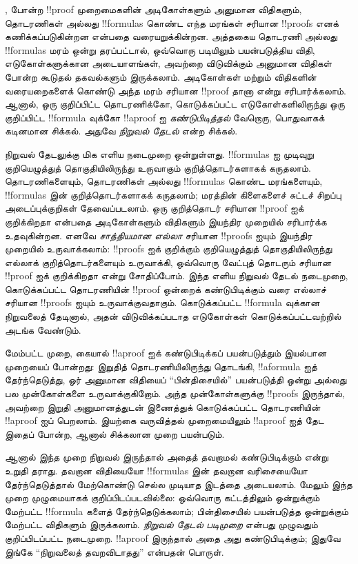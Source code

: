 \documentclass[../../../include/open-logic-section]{subfiles}
\begin{document}


,  போன்ற !!{proof} முறைமைகளின்
அடிகோள்களும் அனுமான விதிகளும், தொடரணிகள் அல்லது
!!{formula}s கொண்ட எந்த மரங்கள் சரியான !!{proof}s
எனக் கணிக்கப்படுகின்றன என்பதை வரையறுக்கின்றன.
அத்தகைய தொடரணி அல்லது !!{formula}s மரம் ஒன்று தரப்பட்டால்,
ஒவ்வொரு படியிலும் பயன்படுத்திய விதி, எடுகோள்களுக்கான
அடையாளங்கள், அவற்றை விடுவிக்கும் அனுமான விதிகள் போன்ற
கூடுதல் தகவல்களும் இருக்கலாம். அடிகோள்கள் மற்றும் விதிகளின்
வரையறைகளைக் கொண்டு அந்த மரம் சரியான !!{proof} தானா
என்று சரிபார்க்கலாம். ஆனால், ஒரு குறிப்பிட்ட தொடரணிக்கோ,
கொடுக்கப்பட்ட எடுகோள்களிலிருந்து ஒரு குறிப்பிட்ட
!!{formula} வுக்கோ !!a{proof} ஐ \emph{கண்டுபிடித்தல்}
வேறொரு, பொதுவாகக் கடினமான சிக்கல். அதுவே
\emph{நிறுவல் தேடல்} என்ற சிக்கல்.

நிறுவல் தேடலுக்கு மிக எளிய நடைமுறை ஒன்றுள்ளது.
!!{formula}s ஐ முடிவுறு குறியெழுத்துத் தொகுதியிலிருந்து
உருவாகும் குறித்தொடர்களாகக் கருதலாம். தொடரணிகளையும்,
தொடரணிகள் அல்லது !!{formula}s கொண்ட மரங்களையும்,
!!{formula}s இன் குறித்தொடர்களாகக் கருதலாம்; மரத்தின்
கிளைகளைச் சுட்டச் சிறப்பு அடைப்புக்குறிகள் தேவைப்படலாம்.
ஒரு குறித்தொடர் சரியான !!{proof} ஐக் குறிக்கிறதா என்பதை
அடிகோள்களும் விதிகளும் இயந்திர முறையில் சரிபார்க்க உதவுகின்றன.
எனவே \emph{சாத்தியமான எல்லா} சரியான !!{proof}s ஐயும்
இயந்திர முறையில் உருவாக்கலாம்: !!{proof}s ஐக் குறிக்கும்
குறியெழுத்துத் தொகுதியிலிருந்து எல்லாக் குறித்தொடர்களையும்
உருவாக்கி, ஒவ்வொரு வேட்புத் தொடரும் சரியான !!{proof} ஐக்
குறிக்கிறதா என்று சோதிப்போம். இந்த எளிய நிறுவல் தேடல்
நடைமுறை, கொடுக்கப்பட்ட தொடரணியின் !!{proof} ஒன்றைக்
கண்டுபிடிக்கும் வரை எல்லாச் சரியான !!{proof}s ஐயும்
உருவாக்குவதாகும். கொடுக்கப்பட்ட !!{formula} வுக்கான
நிறுவலைத் தேடினால், அதன் விடுவிக்கப்படாத எடுகோள்கள்
கொடுக்கப்பட்டவற்றில் அடங்க வேண்டும்.

மேம்பட்ட முறை, கையால் !!a{proof} ஐக் கண்டுபிடிக்கப்
பயன்படுத்தும் இயல்பான முறையைப் போன்றது: இறுதித்
தொடரணியிலிருந்து தொடங்கி, !!a{formula} ஐத் தேர்ந்தெடுத்து,
ஓர் அனுமான விதியைப் ``பின்திசையில்'' பயன்படுத்தி ஒன்று
அல்லது பல முன்கோள்களை உருவாக்குகிறோம். அந்த முன்கோள்களுக்கு
!!{proof}s இருந்தால், அவற்றை இறுதி அனுமானத்துடன் இணைத்துக்
கொடுக்கப்பட்ட தொடரணியின் !!a{proof} ஐப் பெறலாம்.
இயற்கை வருவித்தல் முறைமையிலும் !!a{proof} ஐத் தேட
இதைப் போன்ற, ஆனால் சிக்கலான முறை பயன்படும்.

ஆனால் இந்த முறை நிறுவல் இருந்தால் அதைத் தவறாமல்
கண்டுபிடிக்கும் என்று உறுதி தராது. தவறான விதியையோ
!!{formula}s இன் தவறான வரிசையையோ தேர்ந்தெடுத்தால்
மேற்கொண்டு செல்ல முடியாத இடத்தை அடையலாம். மேலும்
இந்த முறை முழுமையாகக் குறிப்பிடப்படவில்லை: ஒவ்வொரு
கட்டத்திலும் ஒன்றுக்கும் மேற்பட்ட !!{formula} களைத்
தேர்ந்தெடுக்கலாம்; பின்திசையில் பயன்படுத்த ஒன்றுக்கும்
மேற்பட்ட விதிகளும் இருக்கலாம். \emph{நிறுவல் தேடல் படிமுறை}
என்பது முழுவதும் குறிப்பிடப்பட்ட நடைமுறை. !!a{proof}
இருந்தால் அதை அது கண்டுபிடிக்கும்; இதுவே இங்கே
``நிறுவலைத் தவறவிடாதது'' என்பதன் பொருள்.
\end{document}
